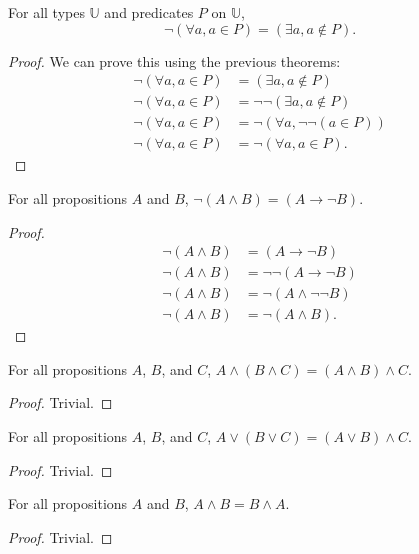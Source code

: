 \documentclass[../../math.tex]{subfiles}
\begin{document}
\begin{theorem}
    For all types $\mathbb U$ and predicates $P$ on $\mathbb U$,
    \[
        \neg(\forall a, a \in P) = (\exists a, a \notin P).
    \]
\end{theorem}
\begin{proof}
    We can prove this using the previous theorems:
    \begin{align*}
        \neg(\forall a, a \in P) &= (\exists a, a \notin P) \\
        \neg(\forall a, a \in P) &= \neg\neg(\exists a, a \notin P) \\
        \neg(\forall a, a \in P) &= \neg(\forall a, \neg \neg (a \in P)) \\
        \neg(\forall a, a \in P) &= \neg(\forall a, a \in P).
    \end{align*}
\end{proof}

\begin{theorem}
    For all propositions $A$ and $B$, $\neg(A \wedge B) = (A \rightarrow \neg
    B)$.
\end{theorem}
\begin{proof}
    \begin{align*}
        \neg(A \wedge B) &= (A \rightarrow \neg B) \\
        \neg(A \wedge B) &= \neg \neg (A \rightarrow \neg B) \\
        \neg(A \wedge B) &= \neg (A \wedge \neg \neg B) \\
        \neg(A \wedge B) &= \neg (A \wedge B).
    \end{align*}
\end{proof}

\begin{theorem} \label{and_assoc}
    For all propositions $A$, $B$, and $C$, $A \wedge (B \wedge C) = (A \wedge
    B) \wedge C$.
\end{theorem}
\begin{proof}
    Trivial.
\end{proof}

\begin{theorem} \label{or_assoc}
    For all propositions $A$, $B$, and $C$, $A \vee (B \vee C) = (A \vee B)
    \wedge C$.
\end{theorem}
\begin{proof}
    Trivial.
\end{proof}

\begin{theorem} \label{and_comm}
    For all propositions $A$ and $B$, $A \wedge B = B \wedge A$.
\end{theorem}
\begin{proof}
    Trivial.
\end{proof}
\end{document}
